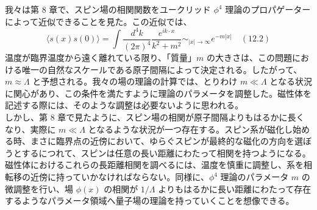 \documentclass[uplatex,dvipdfmx]{jsarticle}
\begin{document}
我々は第 8 章で、スピン場の相関関数をユークリッド $\phi^4$ 理論のプロパゲーターによって近似できることを見た。この近似では、
\begin{equation}
    \langle s(x)s(0) \rangle = \int \frac{d^4k}{(2\pi)^4} \frac{e^{ik \cdot x}}{k^2 + m^2} \sim_{|x| \to \infty} e^{-m|x|} \quad (12.2)
\end{equation}
温度が臨界温度から遠く離れている限り、「質量」$m$ の大きさは、この問題における唯一の自然なスケールである原子間隔によって決定される。したがって、$m \approx \Lambda$ と予想される。我々の場の理論の計算では、とりわけ $m \ll \Lambda$ となる状況に関心があり、この条件を満たすように理論のパラメータを調整した。磁性体を記述する際には、そのような調整は必要ないように思われる。\\
しかし、第 8 章で見たように、スピン場の相関が原子間隔よりもはるかに長くなり、実際に $m \ll \Lambda$ となるような状況が一つ存在する。スピン系が磁化し始める時、まさに臨界点の近傍において、ゆらぐスピンが最終的な磁化の方向を選ぼうとするにつれて、スピンは任意の長い距離にわたって相関を持つようになる。磁性体におけるこれらの長距離相関を調べるには、温度を慎重に調整し、系を相転移の近傍に持っていかなければならない。同様に、$\phi^4$ 理論のパラメータ $m$ の微調整を行い、場 $\phi(x)$ の相関が $1/\Lambda$ よりもはるかに長い距離にわたって存在するようなパラメータ領域へ量子場の理論を持っていくことを想像できる。\\
\end{document}
